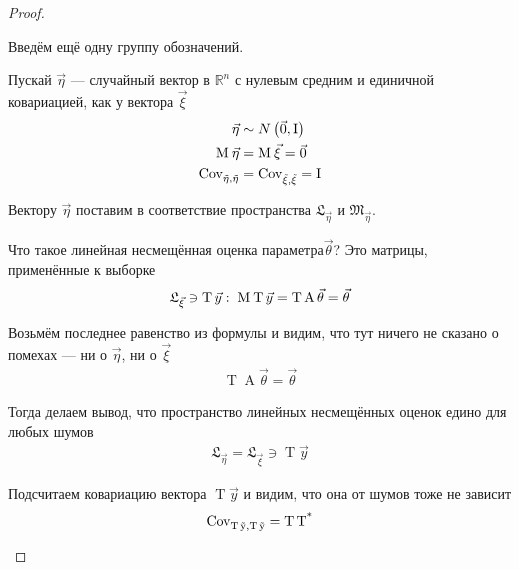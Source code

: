 \begin{proof}
\begin{enumerate}
            Введём ещё одну группу обозначений.

            Пускай $\vec{\eta}$ --- случайный вектор в $\mathbb{R}^n$ с нулевым
            средним и единичной ковариацией, как у вектора $\vec{\xi}$
            \begin{align*}
                \vec{\eta} &\sim N\left( \vec{0}, \operatorname{I} \right) \\
                \operatorname{M}_{} \vec{\eta} &= \operatorname{M}_{} \vec{\xi} = \vec{0} \\
                \operatorname{Cov^{}_{\vec{\eta}, \vec{\eta}}} &= \operatorname{Cov^{}_{\vec{\xi}, \vec{\xi}}} = \operatorname{I}
            \end{align*}

            Вектору $\vec{\eta}$ поставим в соответствие пространства
            $\mathfrak{L}_{\vec{\eta}}$ и $\mathfrak{M}_{\vec{\eta}}$.

            Что такое линейная несмещённая оценка параметра$\vec{\theta}$?
            Это матрицы, применённые к выборке
            \begin{align*}
                \mathfrak{L}_{\vec{\xi}} \ni \operatorname{T} \vec{y}:\;
                \operatorname{M}_{} \operatorname{T} \vec{y}
                = \operatorname{T} \operatorname{A} \vec{\theta}
                = \vec{\theta}
            \end{align*}

            Возьмём последнее равенство из формулы и видим, что тут ничего не
            сказано о помехах --- ни о $\vec{\eta}$, ни о $\vec{\xi}$
            \begin{align*}
                \operatorname{T} \operatorname{A} \vec{\theta}
                = \vec{\theta}
            \end{align*}

            Тогда делаем вывод, что пространство линейных несмещённых оценок
            едино для любых шумов
            \begin{align*}
                \mathfrak{L}_{\vec{\eta}}
                = \mathfrak{L}_{\vec{\xi}}
                \ni \operatorname{T} \vec{y}
            \end{align*}

            Подсчитаем ковариацию вектора $\operatorname{T} \vec{y}$ и видим,
            что она от шумов тоже не зависит
            \begin{align*}
                \operatorname{Cov^{}_{\operatorname{T} \vec{y}, \operatorname{T} \vec{y}}}
                = \operatorname{T} \operatorname{T^*}
            \end{align*}


\end{enumerate}
\end{proof}
